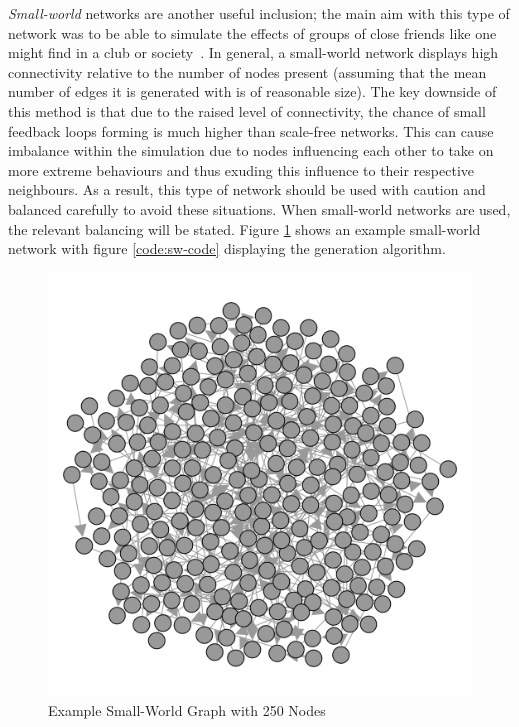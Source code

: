 \documentclass[]{report}
\begin{document}
\emph{Small-world} networks are another useful inclusion; the main aim with this type of network was to be able to simulate the effects of groups of close friends like one might find in a club or society~\cite{small-world}. In general, a small-world network displays high connectivity relative to the number of nodes present (assuming that the mean number of edges it is generated with is of reasonable size). The key downside of this method is that due to the raised level of connectivity, the chance of small feedback loops forming is much higher than scale-free networks. This can cause imbalance within the simulation due to nodes influencing each other to take on more extreme behaviours and thus exuding this influence to their respective neighbours. As a result, this type of network should be used with caution and balanced carefully to avoid these situations. When small-world networks are used, the relevant balancing will be stated. Figure \ref{img:ex-small-world} shows an example small-world network with figure \ref{code:sw-code} displaying the generation algorithm.

\begin{figure}
\begin{center}
\includegraphics[scale=0.25]{ex-small-world.png}
\end{center}
\caption{Example Small-World Graph with 250 Nodes}
\label{img:ex-small-world}
\end{figure}
\end{document}

